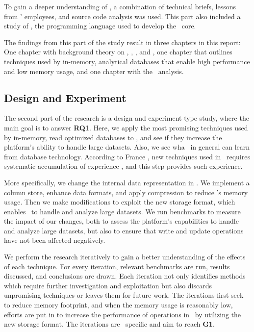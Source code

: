 
To gain a deeper understanding of \gap, a combination of technical briefs, lessons from \genus' employees, and source code analysis was used.  This part also included a study of \delphi, the programming language used to develop the \gap~core.

The findings from this part of the study result in three chapters in this report: One chapter with background theory on \mde, \bi, \bd, and \delphi, one chapter that outlines techniques used by in-memory, analytical databases that enable high performance and low memory usage, and one chapter with the \gap~analysis.

\subsection{Design and Experiment}
\label{sub:Design and Experiment}
The second part of the research is a design and experiment type study, where the main goal is to answer \textbf{RQ1}. Here, we apply the most promising techniques used by in-memory, read optimized databases to \gap, and see if they increase the platform's ability to handle large datasets. Also, we see wha \mde~in general can learn from database technology. According to France \ea, new techniques used in \mde~requires systematic accumulation of experience \cite{France2007-ae}, and this step provides such experience.

More specifically, we change the internal data representation in \gap. We implement a column store, enhance data formats, and apply compression to reduce \gap's memory usage. Then we make modifications to exploit the new storage format, which enables \gap~to handle and analyze large datasets. We run benchmarks to measure the impact of our changes, both to assess the platform's capabilities to handle and analyze large datasets, but also to ensure that write and update operations have not been affected negatively. 

We perform the research iteratively to gain a better understanding of the effects of each technique. For every iteration, relevant benchmarks are run, results discussed, and conclusions are drawn. Each iteration not only identifies methods which require further investigation and exploitation but also discards unpromising techniques or leaves them for future work. The iterations first seek to reduce memory footprint, and when the memory usage is reasonably low, efforts are put in to increase the performance of operations in \gap~by utilizing the new storage format. The iterations are \gap~specific and aim to reach \textbf{G1}. 

